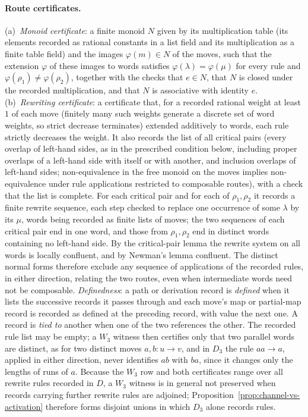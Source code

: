\paragraph{Route certificates.} (a)~\emph{Monoid certificate}: a finite monoid \(N\) given by its multiplication table (its elements recorded as rational constants in a list field and its multiplication as a finite table field) and the images \(\varphi(m)\in N\) of the moves, such that the extension \(\varphi\) of these images to words satisfies \(\varphi(\lambda)=\varphi(\mu)\) for every rule and \(\varphi(\rho_1)\neq\varphi(\rho_2)\), together with the checks that \(e\in N\), that \(N\) is closed under the recorded multiplication, and that \(N\) is associative with identity \(e\).
(b)~\emph{Rewriting certificate}: a certificate that, for a recorded rational weight at least \(1\) of each move (finitely many such weights generate a discrete set of word weights, so strict decrease terminates) extended additively to words, each rule strictly decreases the weight. It also records the list of all critical pairs (every overlap of left-hand sides, as in the prescribed condition below, including proper overlaps of a left-hand side with itself or with another, and inclusion overlaps of left-hand sides; non-equivalence in the free monoid on the moves implies non-equivalence under rule applications restricted to composable routes), with a check that the list is complete. For each critical pair and for each of \(\rho_1,\rho_2\) it records a finite rewrite sequence, each step checked to replace one occurrence of some \(\lambda\) by its \(\mu\), words being recorded as finite lists of moves; the two sequences of each critical pair end in one word, and those from \(\rho_1,\rho_2\) end in distinct words containing no left-hand side. By the critical-pair lemma the rewrite system on all words is locally confluent, and by Newman's lemma confluent. The distinct normal forms therefore exclude any sequence of applications of the recorded rules, in either direction, relating the two routes, even when intermediate words need not be composable.
\emph{Definedness}: a path or derivation record is \emph{defined} when it lists the successive records it passes through and each move's map or partial-map record is recorded as defined at the preceding record, with value the next one.
A record is \emph{tied to} another when one of the two references the other.
The recorded rule list may be empty; a \(W_3\) witness then certifies only that
two parallel words are distinct, as for two distinct moves \(a,b:u\to v\), and
in \(D_3\) the rule \(aa\to a\), applied in either direction, never identifies \(ab\) with \(ba\), since it changes only the lengths of runs of \(a\). Because the \(W_3\) row and both certificates range over all rewrite rules recorded in \(D\), a \(W_3\) witness is in general not preserved when records carrying further rewrite rules are adjoined; Proposition~\ref{prop:channel-vs-activation} therefore forms disjoint unions in which \(D_3\) alone records rules.


